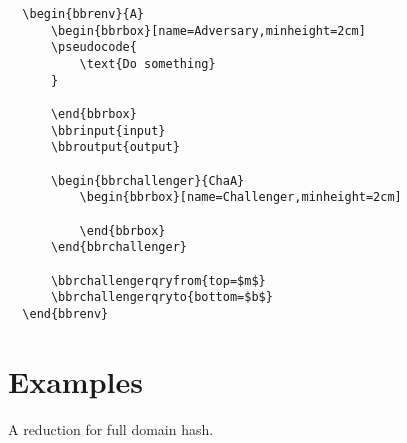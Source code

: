 \documentclass[a4paper]{report}
\begin{document}
  \begin{lstlisting}
  \begin{bbrenv}{A}
	  \begin{bbrbox}[name=Adversary,minheight=2cm]
	  \pseudocode{
		  \text{Do something} 
	  }
  
	  \end{bbrbox}
	  \bbrinput{input}
	  \bbroutput{output}
  
	  \begin{bbrchallenger}{ChaA}
		  \begin{bbrbox}[name=Challenger,minheight=2cm]
		  
		  \end{bbrbox}
	  \end{bbrchallenger}
  
	  \bbrchallengerqryfrom{top=$m$}
	  \bbrchallengerqryto{bottom=$b$}
  \end{bbrenv}
  \end{lstlisting}
  
  \section{Examples}
  A reduction for full domain hash.
  
\end{document}
